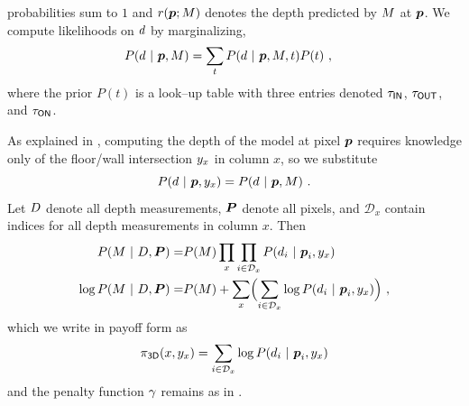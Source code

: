 probabilities sum to $1$ and $r(\boldsymbol{p};M)$ denotes the depth
predicted by $M$ at $\boldsymbol{p}$. We compute likelihoods on $d$ by
marginalizing,
\begin{align}
  \label{eq:3d-likelihood}
  P(d~|~\boldsymbol{p},M) &=
   \sum_{t} P(d~|~\boldsymbol{p},M,t) P(t)
  ~,
\end{align}
where the prior $P(t)$ is a look--up table with three entries denoted
$\tau_{\textsf{IN}}$, $\tau_{\textsf{OUT}}$, and $\tau_{\textsf{ON}}$.

As explained in , computing the depth of the model at
pixel $\boldsymbol{p}$ requires knowledge only of the floor/wall intersection
$y_x$ in column $x$, so we substitute
\begin{equation}
  P(d ~|~ \boldsymbol{p}, y_x) =
  P(d ~|~ \boldsymbol{p}, M) ~.
\end{equation}
Let $D$ denote all depth measurements, $\boldsymbol{P}$ denote all pixels, and $\mathcal{D}_x$ contain
indices for all depth measurements in column $x$. Then
\begin{align}
  P(M ~|~ D,\boldsymbol{P}) = & 
  P(M) \prod_{x} \prod_{i\in\mathcal{D}_x} P(d_i~|~\boldsymbol{p}_i,y_x)
  \\
  \log P(M ~|~ D,\boldsymbol{P}) = & 
  P(M) + \sum_{x} \Bigl( \sum_{i\in\mathcal{D}_x}
  \log P(d_i~|~\boldsymbol{p}_i,y_x) \Bigr) ~,
\end{align}
which we write in payoff form as
\begin{equation}
  \pi_{\textsf{3D}}(x,y_x) = 
  \sum_{i\in\mathcal{D}_x} \log P(d_i~|~\boldsymbol{p}_i,y_x)
\end{equation}
and the penalty function $\gamma$ remains as in .

